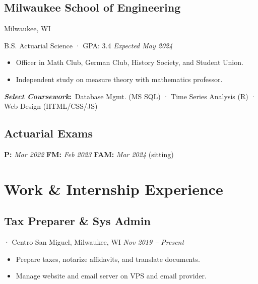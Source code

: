 \documentclass[12pt]{article}
\newcommand{\itemspace}{\vspace{0.3170em}}
\renewcommand{\textsc}[1]{\uppercase{\footnotesize#1}\normalsize}
\newcommand{\examgap}{\hspace{10.85em}}
\begin{document}
\subsection{Milwaukee School of Engineering} \hfill Milwaukee, WI

B.S. Actuarial Science · GPA: 3.4 \hfill \textit{Expected May 2024}

\begin{itemize}[noitemsep,nolistsep]
  \item Officer in Math Club, German Club, History Society, and Student Union.

  \item Independent study on measure theory with mathematics professor.
\end{itemize}

\textbf{\textit{Select Coursework}:} \,Database Mgmt. (\textsc{ms sql}) ·
Time Series Analysis (\textsc{R}) · Web Design (\textsc{html/css/js})

\itemspace

\subsection{Actuarial Exams} \hfill

\textbf{P:}\; \textit{Mar 2022}
\examgap
\textbf{FM:}\; \textit{Feb 2023}
\examgap
\textbf{FAM:}\; \textit{Mar 2024} (sitting)

\itemspace

\section{Work \& Internship Experience}

\subsection{Tax Preparer \& Sys Admin}
· Centro San Miguel, Milwaukee, WI \hfill \textit{Nov 2019 -- Present}

\begin{itemize}[noitemsep,nolistsep]
  \item Prepare taxes, notarize affidavits, and translate documents.

  \item Manage website and email server on VPS and email provider.
\end{itemize}
\end{document}
